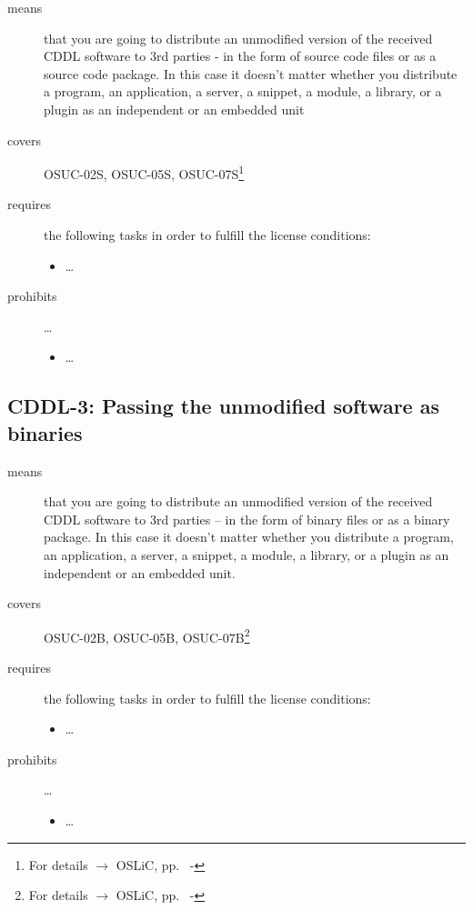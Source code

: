 \begin{description}

\item[means] that you are going to distribute an unmodified version of the
received CDDL software to 3rd parties - in the form of source code files or as a
source code package. In this case it doesn't matter whether you distribute a
program, an application, a server, a snippet, a module, a library, or a plugin
as an independent or an embedded unit

\item[covers] OSUC-02S, OSUC-05S, OSUC-07S\footnote{For details $\rightarrow$
OSLiC, pp.\ \pageref{OSUC-02S-DEF} - \pageref{OSUC-07S-DEF}}

\item[requires] the following tasks in order to fulfill the license conditions:
\begin{itemize}
  
  \item \ldots
  
\end{itemize}

\item[prohibits] \ldots
\begin{itemize}
  \item \ldots
\end{itemize}
\end{description}


\subsection{CDDL-3: Passing the unmodified software as binaries} 
\label{OSUC-02B-CDDL} \label{OSUC-05B-CDDL} \label{OSUC-07B-CDDL}

\begin{description}
\item[means] that you are going to distribute an unmodified version of the
received CDDL software to 3rd parties -- in the form of binary files or as a
bi\-na\-ry package. In this case it doesn't matter whether you distribute a
program, an application, a server, a snippet, a module, a library, or a plugin
as an independent or an embedded unit.

\item[covers] OSUC-02B, OSUC-05B, OSUC-07B\footnote{For details $\rightarrow$
OSLiC, pp.\ \pageref{OSUC-02B-DEF} - \pageref{OSUC-07B-DEF}}

\item[requires] the following tasks in order to fulfill the license conditions:
\begin{itemize}
  
  \item \ldots
  
\end{itemize}

\item[prohibits] \ldots
\begin{itemize}
  \item \ldots
\end{itemize}
\end{description}


